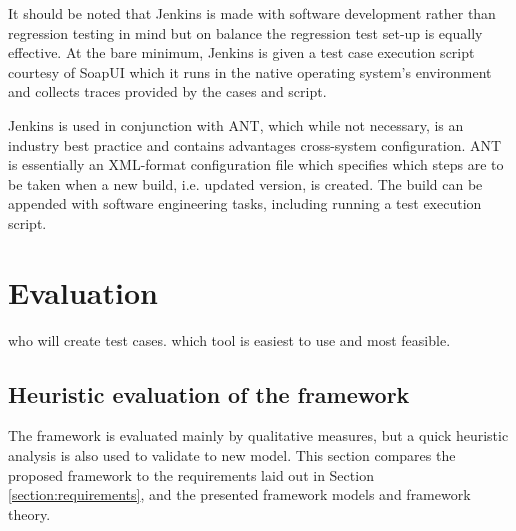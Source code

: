 \documentclass[12pt,a4paper,oneside,pdftex]{report}
\begin{document}
{It should be noted that Jenkins is made with software development rather than regression testing in mind but on balance the regression test set-up is equally effective. At the bare minimum, Jenkins is given a test case execution script courtesy of SoapUI which it runs in the native operating system's environment and collects traces provided by the cases and script.

Jenkins is used in conjunction with ANT, which while not necessary, is an industry best practice and contains advantages cross-system configuration. ANT is essentially an XML-format configuration file which specifies which steps are to be taken when a new build, i.e. updated version, is created. The build can be appended with software engineering tasks, including running a test execution script. 


\chapter{Evaluation}
\label{chapter:evaluation}

who will create test cases. which tool is easiest to use and most feasible.


\section{Heuristic evaluation of the framework}


The framework is evaluated mainly by qualitative measures, but a quick heuristic analysis is also used to validate to new model. This section compares the proposed framework to the requirements laid out in Section \ref{section:requirements}, and the presented framework models and framework theory.

}
\end{document}

